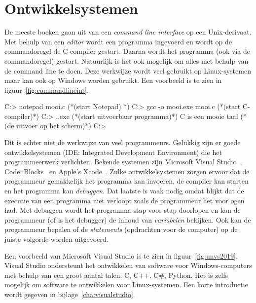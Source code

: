 \section{Ontwikkelsystemen}
De meeste boeken gaan uit van een \textsl{command line interface} op een Unix-derivaat. Met behulp van een \textsl{editor} wordt een programma ingevoerd en wordt op de commandoregel de C-compiler gestart. Daarna wordt het programma (ook via de commandoregel) gestart.
Natuurlijk is het ook mogelijk om alles met behulp van de command line te doen. Deze werkwijze wordt veel gebruikt op Linux-systemen maar kan ook op Windows worden gebruikt. Een voorbeeld is te zien in figuur~\ref{fig:commandlineint}.

\begin{dosbox}[title=Een voorbeeld van een command line interface.,label=fig:commandlineint]
C:\Users\C> notepad mooi.c (*\hfill\textrm{(start Notepad)} *)
C:\Users\C> gcc -o mooi.exe mooi.c (*\hfill\textrm{(start C-compiler)}*)
C:\Users\C> .\mooi.exe (*\hfill\textrm{(start uitvoerbaar programma)}*)
C is een mooie taal (*\hfill\textrm{(de uitvoer op het scherm)}*)
C:\Users\C>
\end{dosbox}

Dit is echter niet de werkwijze van veel programmeurs. Gelukkig zijn er goede ontwikkelsystemen (IDE: Integrated Development Environment) die het programmeerwerk verlichten. Bekende systemen zijn Microsoft Visual Studio~\cite{vs2019}, Code::Blocks~\cite{codeblocks2020} en Apple's Xcode~\cite{xcode2020}.
Zulke ontwikkelsystemen zorgen ervoor dat de programmeur gemakkelijk het programma kan invoeren, de compiler kan starten en het programma kan \textsl{debuggen}. Dat laatste is vaak nodig omdat blijkt dat de executie van een programma niet verloopt zoals de programmeur het voor ogen had. Met debuggen wordt het programma stap voor stap doorlopen en kan de programmeur (of is het debugger) de inhoud van \textsl{variabelen} bekijken. Ook kan de programmeur bepalen of de \textsl{statements} (opdrachten voor de computer) op de juiste volgorde worden uitgevoerd.

Een voorbeeld van Microsoft Visual Studio is te zien in figuur~\ref{fig:unvs2019}. Visual Studio ondersteunt het ontwikkelen van software voor Windows-computers met behulp van een groot aantal talen: C, C++, C\#, Python. Het is zelfs mogelijk om software te ontwikkelen voor Linux-systemen. Een korte introductie wordt gegeven in bijlage~\ref{cha:visualstudio}.

